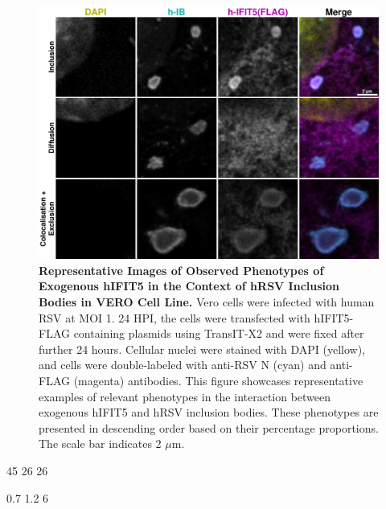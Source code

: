 \begin{figure}
    \centering
    \includegraphics[width=1\linewidth]{09. Chapter 4/Figs/02. Overexpression/04. IFIT5/03. i5-hrsv.pdf}
    \caption[Representative Images of Observed Phenotypes of Exogenous hIFIT5 in the Context of hRSV Inclusion Bodies in VERO Cell Line.]{\textbf{Representative Images of Observed Phenotypes of Exogenous hIFIT5 in the Context of hRSV Inclusion Bodies in VERO Cell Line.} Vero cells were infected with human RSV at MOI 1. 24 HPI, the cells were transfected with hIFIT5-FLAG containing plasmids using TransIT-X2 and were fixed after further 24 hours. Cellular nuclei were stained with DAPI (yellow), and cells were double-labeled with anti-RSV N (cyan) and anti-FLAG (magenta) antibodies. This figure showcases representative examples of relevant phenotypes in the interaction between exogenous hIFIT5 and hRSV inclusion bodies. These phenotypes are presented in descending order based on their percentage proportions. The scale bar indicates 2 \(\mu \mbox{m}\).}
    \label{fig:Representative Images of Observed Phenotypes of Exogenous hIFIT5 in the Context of hRSV Inclusion Bodies in VERO Cell Line}
\end{figure}

45 26 26

0.7 1.2 6

